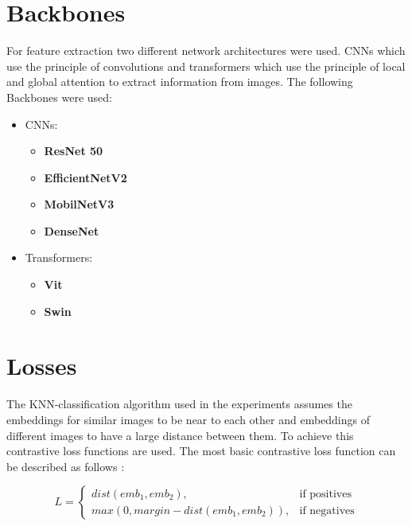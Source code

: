 \documentclass[12pt,a4paper]{report}
\begin{document}
\section{Backbones}
For feature extraction two different network architectures were used.
CNNs which use the principle of convolutions and transformers which use the principle of local and global attention to extract information from images. 
The following Backbones were used:
\begin{itemize}
	\item CNNs:\begin{itemize}
		\item \textbf{ResNet 50} \cite{resnet}
		\item \textbf{EfficientNetV2} \cite{EfficientNetV2}
		\item \textbf{MobilNetV3} \cite{MobilNetV3}
		\item \textbf{DenseNet} \cite{DenseNet}
	\end{itemize}
	\item Transformers:\begin{itemize}
		\item \textbf{Vit} \cite{ViT}
		\item \textbf{Swin} \cite{liu2021swin}
    \end{itemize}
\end{itemize}

\section{Losses}
The KNN-classification algorithm used in the experiments assumes the embeddings for similar images to be near to each other
and embeddings of different images to have a large distance between them.
To achieve this contrastive loss functions are used.
The most basic contrastive loss function can be described as follows \cite{ContrastiveLoss}:

\begin{equation*}
L = \begin{cases} 
		dist(emb_1,emb_2),& \text{if positives}\\
		max(0,margin-dist(emb_1,emb_2)),& \text{if negatives}
	\end{cases}
\end{equation*}
\end{document}
